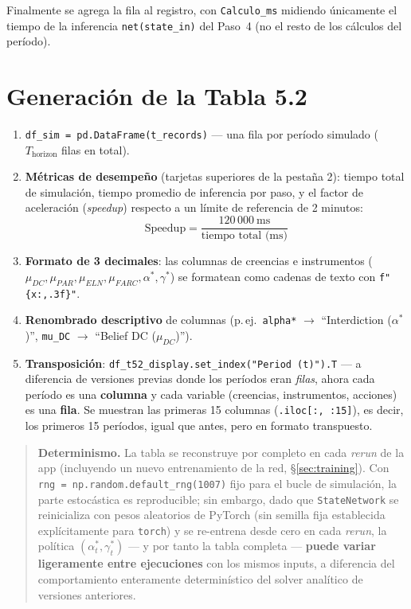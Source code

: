 \documentclass[ecta,nameyear,draft]{econsocart}
\newcommand{\pyvar}[1]{\texttt{#1}}
\begin{document}
Finalmente se agrega la fila al registro, con \pyvar{Calculo\_ms} midiendo únicamente el
tiempo de la inferencia \pyvar{net(state\_in)} del Paso~4 (no el resto de los cálculos del
período).

\section{Generación de la Tabla 5.2}\label{sec:tabla52}

\begin{enumerate}
\item \pyvar{df\_sim = pd.DataFrame(\allowbreak t\_records)} --- una fila por período simulado
($T_{\mathrm{horizon}}$ filas en total).
\item \textbf{Métricas de desempeño} (tarjetas superiores de la pestaña 2): tiempo total de
simulación, tiempo promedio de inferencia por paso, y el factor de aceleración
(\emph{speedup}) respecto a un límite de referencia de 2 minutos:
\begin{equation}
\text{Speedup} = \frac{120\,000\ \text{ms}}{\text{tiempo total (ms)}}
\end{equation}
\item \textbf{Formato de 3 decimales}: las columnas de creencias e instrumentos
($\mu_{DC},\mu_{PAR},\mu_{ELN},\mu_{FARC},\alpha^\ast,\gamma^\ast$) se formatean como cadenas
de texto con \pyvar{f"\{x:,.3f\}"}.
\item \textbf{Renombrado descriptivo} de columnas (p.\,ej.\ \pyvar{alpha*} $\to$
``Interdiction ($\alpha^\ast$)'', \pyvar{mu\_DC} $\to$ ``Belief DC ($\mu_{DC}$)'').
\item \textbf{Transposición}: \pyvar{df\_t52\_display.set\_index(\allowbreak "Period (t)").T} --- a
diferencia de versiones previas donde los períodos eran \emph{filas}, ahora cada período es
una \textbf{columna} y cada variable (creencias, instrumentos, acciones) es una \textbf{fila}.
Se muestran las primeras 15 columnas (\pyvar{.iloc[:, :15]}), es decir, los primeros 15
períodos, igual que antes, pero en formato transpuesto.
\end{enumerate}

\begin{quotation}
\noindent\textbf{Determinismo.} La tabla se reconstruye por completo en cada \emph{rerun} de
la app (incluyendo un nuevo entrenamiento de la red, \S\ref{sec:training}). Con
\texttt{rng = np.random.default\_rng(1007)} fijo para el bucle de simulación, la parte
estocástica es reproducible; sin embargo, dado que \pyvar{StateNetwork} se reinicializa con
pesos aleatorios de PyTorch (sin semilla fija establecida explícitamente para
\pyvar{torch}) y se re-entrena desde cero en cada \emph{rerun}, la política
$(\alpha_t^\ast,\gamma_t^\ast)$ --- y por tanto la tabla completa --- \textbf{puede variar
ligeramente entre ejecuciones} con los mismos inputs, a diferencia del comportamiento
enteramente determinístico del solver analítico de versiones anteriores.
\end{quotation}
\end{document}
